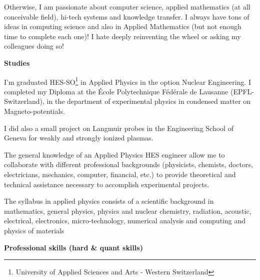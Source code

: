 	Otherwise, I am passionate about computer science, applied mathematics (at all conceivable field), hi-tech systems and knowledge transfer. I always have tons of ideas in computing science and also in Applied Mathematics (but not enough time to complete each one)! I hate deeply reinventing the wheel or asking my colleagues doing so!

\textbf{Studies}	

	I'm graduated HES-SO\footnote{University of Applied Sciences and Arts - Western Switzerland} in Applied Physics in the option Nuclear Engineering. I completed my Diploma at the École Polytechnique Fédérale de Lausanne (EPFL-Switzerland), in the department of experimental physics in condensed matter on Magneto-potentials.
	
	 I did also a small project on Langmuir probes in the Engineering School of Geneva for weakly and strongly ionized plasmas.
	
	The general knowledge of an Applied Physics HES engineer allow me to collaborate with different professional backgrounds (physicists, chemists, doctors, electricians, mechanics, computer, financial, etc.) to provide theoretical and technical assistance necessary to accomplish experimental projects.

	The syllabus in applied physics consists of a scientific background in mathematics, general physics, physics and nuclear chemistry, radiation, acoustic, electrical, electronics, micro-technology, numerical analysis and computing and physics of materials

\textbf{Professional skills (hard \& quant skills)}


